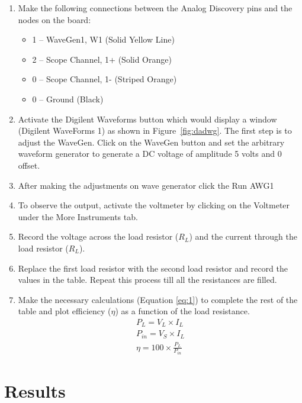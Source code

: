 \documentclass{article}
\begin{document}
\begin{enumerate}
  \item Make the following connections between the Analog Discovery pins and the nodes on the
  board:
  \begin{itemize}
    \item 1 – WaveGen1, W1 (Solid Yellow Line)
    \item 2 – Scope Channel, 1+ (Solid Orange)
    \item 0 – Scope Channel, 1- (Striped Orange)
    \item 0 – Ground (Black)
  \end{itemize}
  \item Activate the Digilent Waveforms button which would display a window (Digilent
  WaveForms 1) as shown in Figure~\ref{fig:dadwg}. The first step is to adjust the WaveGen.
  Click on the WaveGen button and set the arbitrary waveform generator to generate a DC
  voltage of amplitude 5 volts and 0 offset.
  \item After making the adjustments on wave generator click the Run AWG1
  \item To observe the output, activate the voltmeter by clicking on the Voltmeter under the
  More Instruments tab.
  \item Record the voltage across the load resistor ($R_L$) and the current through the load resistor
  ($R_L$).
  \item Replace the first load resistor with the second load resistor and record the values in the
  table. Repeat this process till all the resistances are filled.
  \item Make the necessary calculations (Equation \ref{eq:1}) to complete the rest of the table and plot efficiency ($\eta$) as a
function of the load resistance.
  \begin{equation}
    \begin{gathered}
      P_L = V_L \times I_L \\
      P_{in} = V_S \times I_L \\
      \eta = 100 \times \frac{P_L}{P_{in}}
    \end{gathered}\label{eq:1}
  \end{equation}



\end{enumerate}
  \clearpage

  \section{Results}
  \label{sec:results}
  
\end{document}
